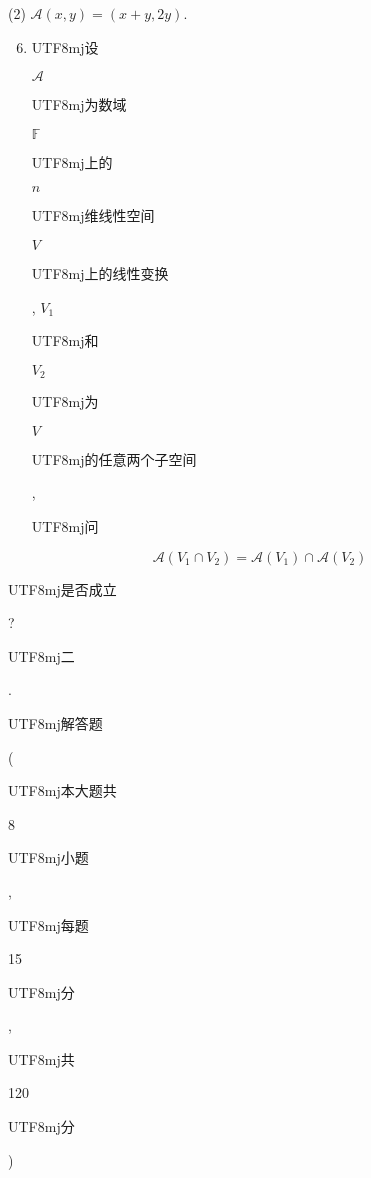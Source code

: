 \documentclass[10pt]{article}
\begin{document}
(2) $\mathscr{A}(x, y)=(x+y, 2 y)$.

\begin{enumerate}
  \setcounter{enumi}{5}
  \item \begin{CJK}{UTF8}{mj}设\end{CJK} $\mathscr{A}$ \begin{CJK}{UTF8}{mj}为数域\end{CJK} $\mathbb{F}$ \begin{CJK}{UTF8}{mj}上的\end{CJK} $n$ \begin{CJK}{UTF8}{mj}维线性空间\end{CJK} $V$ \begin{CJK}{UTF8}{mj}上的线性变换\end{CJK}, $V_{1}$ \begin{CJK}{UTF8}{mj}和\end{CJK} $V_{2}$ \begin{CJK}{UTF8}{mj}为\end{CJK} $V$ \begin{CJK}{UTF8}{mj}的任意两个子空间\end{CJK}, \begin{CJK}{UTF8}{mj}问\end{CJK}
\end{enumerate}
$$
\mathscr{A}\left(V_{1} \cap V_{2}\right)=\mathscr{A}\left(V_{1}\right) \cap \mathscr{A}\left(V_{2}\right)
$$
\begin{CJK}{UTF8}{mj}是否成立\end{CJK}?

\begin{CJK}{UTF8}{mj}二\end{CJK}. \begin{CJK}{UTF8}{mj}解答题\end{CJK} (\begin{CJK}{UTF8}{mj}本大题共\end{CJK} 8 \begin{CJK}{UTF8}{mj}小题\end{CJK}, \begin{CJK}{UTF8}{mj}每题\end{CJK} 15 \begin{CJK}{UTF8}{mj}分\end{CJK}, \begin{CJK}{UTF8}{mj}共\end{CJK} 120 \begin{CJK}{UTF8}{mj}分\end{CJK})
\end{document}
